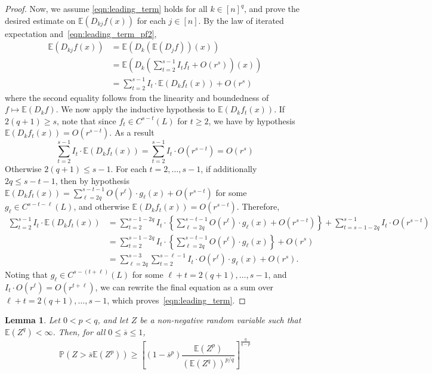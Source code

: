 \documentclass{article}
\newcommand{\1}{\mathbf{1}}
\newcommand{\Ebb}{\mathbb{E}}
\theoremstyle{alden}
\theoremstyle{aldenthm}
\newtheorem{lemma}{Lemma}
\theoremstyle{definition}
\theoremstyle{remark}
\begin{document}
\begin{proof}
	Now, we assume \eqref{eqn:leading_term} holds for all $k \in [n]^q$, and prove the desired estimate on $\Ebb(D_{kj}f(x))$ for each $j \in [n]$. By the law of iterated expectation and~\eqref{eqn:leading_term_pf2},
	\begin{align*}
	\Ebb(D_{kj}f(x)) & = \Ebb(D_k(\Ebb(D_jf))(x)) \\
	& = \Ebb\left(D_k\left(\sum_{t = 2}^{s - 1} I_t f_t + O(r^s)\right)(x)\right) \\
	& = \sum_{t = 2}^{s - 1} I_t \cdot \Ebb(D_kf_t(x)) + O(r^s)
	\end{align*}
	where the second equality follows from the linearity and boundedness of $f \mapsto \Ebb(D_kf)$. We now apply the inductive hypothesis to $\Ebb(D_kf_t(x))$. If $2(q + 1) \geq s$, note that since $f_t \in C^{s - t}(L)$ for $t \geq 2$, we have by hypothesis $\Ebb(D_kf_t(x)) = O(r^{s - t})$. As a result
	\begin{equation*}
	\sum_{t = 2}^{s - 1} I_t \cdot \Ebb(D_kf_t(x)) = \sum_{t = 2}^{s - 1} I_t \cdot O(r^{s - t}) = O(r^s)
	\end{equation*} 
	Otherwise $2(q + 1) \leq s - 1$. For each $t = 2,\ldots, s - 1$, if additionally  $2q \leq s - t - 1$, then by hypothesis $\Ebb(D_kf_t(x)) = \sum_{\ell = 2q}^{s - t - 1} O(r^{\ell}) \cdot g_{\ell}(x) + O(r^{s - t})$ for some $g_{\ell} \in C^{s - t - \ell}(L)$, and otherwise $\Ebb(D_kf_t(x)) = O(r^{s - t})$. Therefore,
	\begin{align*}
	\sum_{t = 2}^{s - 1} I_t \cdot \Ebb(D_kf_t(x)) & = \sum_{t = 2}^{s - 1 - 2q} I_t \cdot \left\{\sum_{\ell = 2q}^{s - t - 1} O(r^{\ell}) \cdot g_{\ell}(x) + O(r^{s - t}) \right\} + \sum_{t = s - 1 - 2q}^{s - 1}I_{t} \cdot O(r^{s - t}) \\
	& = \sum_{t = 2}^{s - 1 - 2q} I_t \cdot \left\{\sum_{\ell = 2q}^{s - t - 1} O(r^{\ell}) \cdot g_{\ell}(x)\right\}  + O(r^s) \\
	& = \sum_{\ell = 2q}^{s - 3} \sum_{t = 2}^{s - \ell - 1} I_t \cdot O(r^{\ell}) \cdot g_{\ell}(x) + O(r^s).
	\end{align*}
	Noting that $g_{\ell} \in C^{s - (t + \ell)}(L)$ for some $\ell + t = 2(q + 1),\ldots,s - 1$, and $I_t \cdot O(r^{\ell}) = O(r^{t + \ell})$, we can rewrite the final equation as a sum over $\ell + t = 2(q + 1),\ldots,s - 1$, which proves~\eqref{eqn:leading_term}.
\end{proof}


\begin{lemma}
	\label{lem:paley_zygmund}
	Let $0 < p < q$, and let $Z$ be a non-negative random variable such that $\mathbb{E}(Z^q) < \infty$. Then, for all $0 \leq \overline{s} \leq 1$,
	\begin{equation}
	\label{eqn:paley_zygmund}
	\mathbb{P}(Z > \overline{s} \mathbb{E}(Z^p)) \geq \left[(1 - \overline{s}^p) \frac{\mathbb{E}(Z^p)}{(\mathbb{E}(Z^q))^{p/q}}\right]^{\frac{q}{q - p}}
	\end{equation}
\end{lemma}
\end{document}
